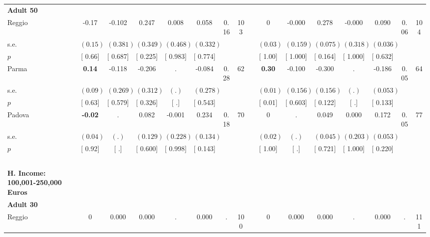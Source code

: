 \begin{longtable}{L{8em} c c c c c c c p{1em} c c c c c c c}
\quad \quad \textbf{Adult 50} & & & & & & & & & & & & & & & \\* 
\quad \quad \quad Reggio& -0.17 &    -0.102 &     0.247 &     0.008 &     0.058 &      0.16 &       103 & & 0 &    -0.000 &     0.278 &    -0.000 &     0.090 &      0.06 &       104  \\*
\quad \quad \quad \quad s.e.& $ (     0.15)$ & $ (    0.381)$ & $ (    0.349)$ & $ (    0.468)$ & $ (    0.332)$ & & & & $ (     0.03)$ & $ (    0.159)$ & $ (    0.075)$ & $ (    0.318)$ & $ (    0.036)$ & &  \\*
\quad \quad \quad \quad $ p$ & [     0.66] & [    0.687] & [    0.225] & [    0.983] & [    0.774] & & & & [     1.00] & [    1.000] & [    0.164] & [    1.000] & [    0.632] & &  \\[1em]
\quad \quad \quad Parma& \textbf{     0.14} &    -0.118 &    -0.206 &         . &    -0.084 &      0.28 &        62 & & \textbf{     0.30} &    -0.100 &    -0.300 &         . &    -0.186 &      0.05 &        64  \\*
\quad \quad \quad \quad s.e.& $ (     0.09)$ & $ (    0.269)$ & $ (    0.312)$ & $ (        .)$ & $ (    0.278)$ & & & & $ (     0.01)$ & $ (    0.156)$ & $ (    0.156)$ & $ (        .)$ & $ (    0.053)$ & &  \\*
\quad \quad \quad \quad $ p$ & [     0.63] & [    0.579] & [    0.326] & [        .] & [    0.543] & & & & [     0.01] & [    0.603] & [    0.122] & [        .] & [    0.133] & &  \\[1em]
\quad \quad \quad Padova& \textbf{    -0.02} &         . &     0.082 &    -0.001 &     0.234 &      0.18 &        70 & & 0 &         . &     0.049 &     0.000 &     0.172 &      0.05 &        77  \\*
\quad \quad \quad \quad s.e.& $ (     0.04)$ & $ (        .)$ & $ (    0.129)$ & $ (    0.228)$ & $ (    0.134)$ & & & & $ (     0.02)$ & $ (        .)$ & $ (    0.045)$ & $ (    0.203)$ & $ (    0.053)$ & &  \\*
\quad \quad \quad \quad $ p$ & [     0.92] & [        .] & [    0.600] & [    0.998] & [    0.143] & & & & [     1.00] & [        .] & [    0.721] & [    1.000] & [    0.220] & &  \\[1em]
~\\[1em]
\textbf{H. Income: 100,001-250,000 Euros} \\*
\quad \quad \textbf{Adult 30} & & & & & & & & & & & & & & & \\* 
\quad \quad \quad Reggio& 0 &     0.000 &     0.000 &         . &     0.000 &         . &       100 & & 0 &     0.000 &     0.000 &         . &     0.000 &         . &       111  \\*

\end{longtable}
